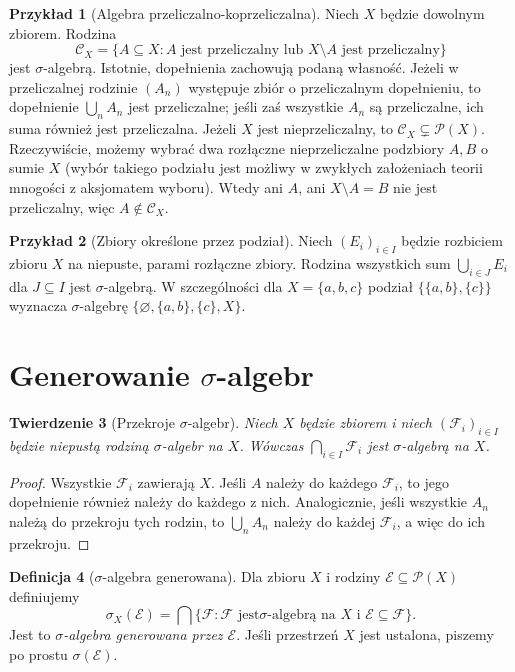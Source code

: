 \documentclass[11pt,a4paper,oneside]{book}
\numberwithin{equation}{chapter}
\theoremstyle{plain}
\newtheorem{twierdzenie}{Twierdzenie}[chapter]
\theoremstyle{definition}
\newtheorem{definicja}[twierdzenie]{Definicja}
\newtheorem{przyklad}[twierdzenie]{Przykład}
\theoremstyle{remark}
\begin{document}
\begin{przyklad}[Algebra przeliczalno-koprzeliczalna]
\label{ex:countable-cocountable}
Niech $X$ będzie dowolnym zbiorem. Rodzina
\[
\mathcal C_X=\{A\subseteq X:A\text{ jest przeliczalny lub }X\setminus A
\text{ jest przeliczalny}\}
\]
jest $\sigma$-algebrą. Istotnie, dopełnienia zachowują podaną własność.
Jeżeli w przeliczalnej rodzinie $(A_n)$ występuje zbiór o przeliczalnym
dopełnieniu, to dopełnienie $\bigcup_nA_n$ jest przeliczalne; jeśli zaś
wszystkie $A_n$ są przeliczalne, ich suma również jest przeliczalna.
Jeżeli $X$ jest nieprzeliczalny, to $\mathcal C_X\subsetneq\mathcal P(X)$.
Rzeczywiście, możemy wybrać dwa rozłączne nieprzeliczalne podzbiory
$A,B$ o sumie $X$ (wybór takiego podziału jest możliwy w zwykłych
założeniach teorii mnogości z aksjomatem wyboru). Wtedy ani $A$,
ani $X\setminus A=B$ nie jest przeliczalny, więc
$A\notin\mathcal C_X$.
\end{przyklad}

\begin{przyklad}[Zbiory określone przez podział]
Niech $(E_i)_{i\in I}$ będzie rozbiciem zbioru $X$ na niepuste, parami
rozłączne zbiory. Rodzina wszystkich sum $\bigcup_{i\in J}E_i$ dla
$J\subseteq I$ jest $\sigma$-algebrą. W szczególności dla
$X=\{a,b,c\}$ podział $\{\{a,b\},\{c\}\}$ wyznacza $\sigma$-algebrę
$\{\varnothing,\{a,b\},\{c\},X\}$.
\end{przyklad}

\section{Generowanie \texorpdfstring{$\sigma$}{sigma}-algebr}

\begin{twierdzenie}[Przekroje $\sigma$-algebr]
\label{thm:intersection-sigma}
Niech $X$ będzie zbiorem i niech $(\mathcal F_i)_{i\in I}$ będzie
niepustą rodziną $\sigma$-algebr na $X$. Wówczas
$\bigcap_{i\in I}\mathcal F_i$ jest $\sigma$-algebrą na $X$.
\end{twierdzenie}
\begin{proof}
Wszystkie $\mathcal F_i$ zawierają $X$. Jeśli $A$ należy do każdego
$\mathcal F_i$, to jego dopełnienie również należy do każdego z nich.
Analogicznie, jeśli wszystkie $A_n$ należą do przekroju tych rodzin,
to $\bigcup_nA_n$ należy do każdej $\mathcal F_i$, a więc do ich przekroju.
\end{proof}

\begin{definicja}[$\sigma$-algebra generowana]
\label{def:sigma-generated}
Dla zbioru $X$ i rodziny $\mathcal E\subseteq\mathcal P(X)$ definiujemy
\[
\sigma_X(\mathcal E)=\bigcap\{\mathcal F:\mathcal F\text{ jest
$\sigma$-algebrą na }X\text{ i }\mathcal E\subseteq\mathcal F\}.
\]
Jest to \emph{$\sigma$-algebra generowana przez $\mathcal E$}.
Jeśli przestrzeń $X$ jest ustalona, piszemy po prostu $\sigma(\mathcal E)$.
\end{definicja}
\end{document}
